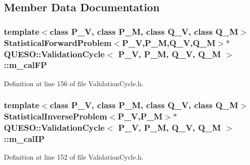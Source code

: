 \subsection{Member Data Documentation}
\hypertarget{class_q_u_e_s_o_1_1_validation_cycle_ab91bdb2d36652abb6275af640f2844bd}{
\subsubsection[{m\-\_\-cal\-F\-P}]{\setlength{\rightskip}{0pt plus 5cm}template$<$class P\-\_\-\-V, class P\-\_\-\-M, class Q\-\_\-\-V, class Q\-\_\-\-M$>$ {\bf Statistical\-Forward\-Problem}$<$P\-\_\-\-V,P\-\_\-\-M,Q\-\_\-\-V,Q\-\_\-\-M$>$$\ast$ {\bf Q\-U\-E\-S\-O\-::\-Validation\-Cycle}$<$ P\-\_\-\-V, P\-\_\-\-M, Q\-\_\-\-V, Q\-\_\-\-M $>$\-::m\-\_\-cal\-F\-P\hspace{0.3cm}{\ttfamily [private]}}}\label{class_q_u_e_s_o_1_1_validation_cycle_ab91bdb2d36652abb6275af640f2844bd}


Definition at line 156 of file Validation\-Cycle.\-h.

\hypertarget{class_q_u_e_s_o_1_1_validation_cycle_afa19cacc32a262840f2108ed405f0521}{
\subsubsection[{m\-\_\-cal\-I\-P}]{\setlength{\rightskip}{0pt plus 5cm}template$<$class P\-\_\-\-V, class P\-\_\-\-M, class Q\-\_\-\-V, class Q\-\_\-\-M$>$ {\bf Statistical\-Inverse\-Problem}$<$P\-\_\-\-V,P\-\_\-\-M$>$$\ast$ {\bf Q\-U\-E\-S\-O\-::\-Validation\-Cycle}$<$ P\-\_\-\-V, P\-\_\-\-M, Q\-\_\-\-V, Q\-\_\-\-M $>$\-::m\-\_\-cal\-I\-P\hspace{0.3cm}{\ttfamily [private]}}}\label{class_q_u_e_s_o_1_1_validation_cycle_afa19cacc32a262840f2108ed405f0521}


Definition at line 152 of file Validation\-Cycle.\-h.

